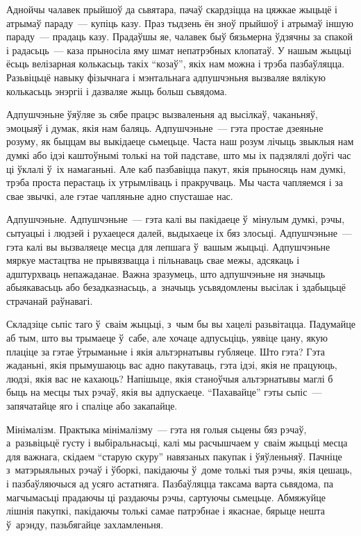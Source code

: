 Аднойчы чалавек прыйшоў да сьвятара, пачаў скардзіцца на цяжкае жыцьцё і атрымаў параду~--- купіць казу. Праз тыдзень ён зноў прыйшоў і атрымаў іншую параду~--- прадаць казу. Прадаўшы яе, чалавек быў бязьмерна ўдзячны за спакой і радасьць~--- каза прыносіла яму шмат непатрэбных клопатаў. У нашым жыцьці ёсьць велізарная колькасьць такіх ``козаў'', якіх нам можна і трэба пазбаўляцца. Разьвіцьцё навыку фізычнага і мэнтальнага адпушчэньня вызваляе вялікую колькасьць энэргіі і дазваляе жыць больш сьвядома.

Адпушчэньне ўяўляе зь сябе працэс вызваленьня ад высілкаў, чаканьняў, эмоцыяў і думак, якія нам баляць. Адпушчэньне~--- гэта простае дзеяньне розуму, як быццам вы выкідаеце сьмецьце. Часта наш розум лічыць звыклыя нам думкі або ідэі каштоўнымі толькі на той падставе, што мы іх падзялялі доўгі час ці ўклалі ў~іх намаганьні. Але каб пазбавіцца пакут, якія прыносяць нам думкі, трэба проста перастаць іх утрымліваць і пракручваць. Мы часта чапляемся і за свае звычкі, але гэтае чапляньне адно спусташае нас.

Адпушчэньне. Адпушчэньне~--- гэта калі вы пакідаеце ў~мінулым думкі, рэчы, сытуацыі і людзей і рухаецеся далей, выдыхаеце іх бяз злосьці. Адпушчэньне~--- гэта калі вы вызваляеце месца для лепшага ў~вашым жыцьці. Адпушчэньне мяркуе мастацтва не прывязвацца і пільнаваць свае межы, адсякаць і адштурхваць непажаданае. Важна зразумець, што адпушчэньне ня значыць абыякавасьць або безадказнасьць, а~значыць усьвядомлены высілак і здабыцьцё страчанай раўнавагі.

Складзіце сьпіс таго ў~сваім жыцьці, з~чым бы вы хацелі разьвітацца. Падумайце аб тым, што вы трымаеце ў~сабе, але хочаце адпусьціць, уявіце цану, якую плаціце за гэтае ўтрыманьне і якія альтэрнатывы губляеце. Што гэта? Гэта жаданьні, якія прымушаюць вас адно пакутаваць, гэта ідэі, якія не працуюць, людзі, якія вас не кахаюць? Напішыце, якія станоўчыя альтэрнатывы маглі б быць на месцы тых рэчаў, якія вы адпускаеце. ``Пахавайце'' гэты сьпіс~--- запячатайце яго і спаліце або закапайце.

Мінімалізм. Практыка мінімалізму~--- гэта ня голыя сьцены бяз рэчаў, а~разьвіцьцё густу і выбіральнасьці, калі мы расчышчаем у~сваім жыцьці месца для важнага, скідаем ``старую скуру'' навязаных пакупак і ўяўленьняў. Пачніце з~матэрыяльных рэчаў і ўборкі, пакідаючы ў~доме толькі тыя рэчы, якія цешаць, і пазбаўляючыся ад усяго астатняга. Пазбаўляцца таксама варта сьвядома, па магчымасьці прадаючы ці раздаючы рэчы, сартуючы сьмецьце. Абмяжуйце лішнія пакупкі, пакідаючы толькі самае патрэбнае і якаснае, бярыце нешта ў~арэнду, пазьбягайце захламленьня.

